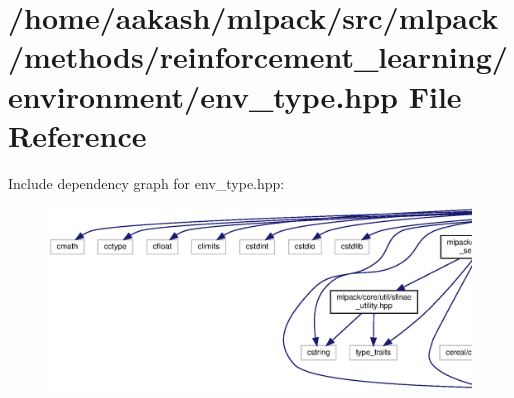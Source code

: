 \section{/home/aakash/mlpack/src/mlpack/methods/reinforcement\+\_\+learning/environment/env\+\_\+type.hpp File Reference}
\label{env__type_8hpp}
Include dependency graph for env\+\_\+type.\+hpp\+:
\nopagebreak
\begin{figure}[H]
\begin{center}
\leavevmode
\includegraphics[width=350pt]{env__type_8hpp__incl}
\end{center}
\end{figure}
